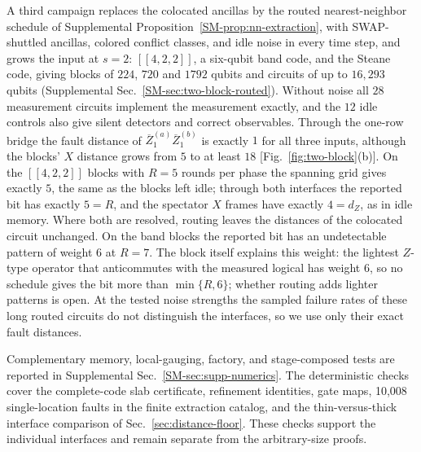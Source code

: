 A third campaign replaces the colocated ancillas by the routed
nearest-neighbor schedule of Supplemental
Proposition~\ref{SM-prop:nn-extraction}, with SWAP-shuttled ancillas,
colored conflict classes, and idle noise in every time step, and grows the
input at $s=2$: $[[4,2,2]]$, a six-qubit band code, and the Steane code,
giving blocks of $224$, $720$ and $1792$ qubits and circuits of up to
$16{,}293$ qubits (Supplemental Sec.~\ref{SM-sec:two-block-routed}).  Without
noise all $28$ measurement circuits implement the measurement exactly, and
the $12$ idle controls also give silent detectors and correct observables.  Through the one-row bridge the
fault distance of $\overline Z_1^{(a)}\overline Z_1^{(b)}$ is exactly $1$ for
all three inputs, although the blocks' $X$ distance grows from $5$ to at
least $18$ [Fig.~\ref{fig:two-block}(b)].  On the $[[4,2,2]]$ blocks with $R=5$ rounds per phase
the spanning grid gives exactly $5$, the same as the blocks left idle;
through both interfaces the reported bit has exactly $5=R$, and the
spectator $X$ frames have exactly $4=d_Z$, as in idle memory.  Where both are
resolved, routing leaves the distances of the colocated circuit unchanged.
On the band blocks the reported bit has an undetectable pattern of weight $6$
at $R=7$.  The block itself explains this weight: the lightest $Z$-type
operator that anticommutes with the measured logical has weight $6$, so no
schedule gives the bit more than $\min\{R,6\}$; whether routing adds lighter
patterns is open.  At the tested noise strengths the sampled
failure rates of these long routed circuits do not distinguish the
interfaces, so we use only their exact fault distances.

Complementary memory, local-gauging, factory, and stage-composed
tests are reported in Supplemental Sec.~\ref{SM-sec:supp-numerics}. The
deterministic checks cover the complete-code slab certificate, refinement
identities, gate maps, 10,008 single-location faults in the finite extraction
catalog, and the thin-versus-thick interface comparison of
Sec.~\ref{sec:distance-floor}. These checks support the individual
interfaces and remain separate from the arbitrary-size proofs.

